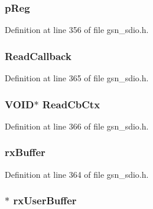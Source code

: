 \hypertarget{a00216_a733fb7afbc3bd37a546de0e37c12f150}{
\subsubsection[{pReg}]{ {\bf pReg}}}
\label{a00216_a733fb7afbc3bd37a546de0e37c12f150}


Definition at line 356 of file gsn\_\-sdio.h.

\hypertarget{a00216_a13c6299f64f8152d048be374004adc1d}{
\subsubsection[{ReadCallback}]{ {\bf ReadCallback}}}
\label{a00216_a13c6299f64f8152d048be374004adc1d}


Definition at line 365 of file gsn\_\-sdio.h.

\hypertarget{a00216_ab670c794162551aa7f8c6a4103007e7b}{
\subsubsection[{ReadCbCtx}]{\setlength{\rightskip}{0pt plus 5cm}VOID$\ast$ {\bf ReadCbCtx}}}
\label{a00216_ab670c794162551aa7f8c6a4103007e7b}


Definition at line 366 of file gsn\_\-sdio.h.

\hypertarget{a00216_ab33acc5a2a02cec5e984720d9be033c6}{
\subsubsection[{rxBuffer}]{ {\bf rxBuffer}}}
\label{a00216_ab33acc5a2a02cec5e984720d9be033c6}


Definition at line 364 of file gsn\_\-sdio.h.

\hypertarget{a00216_ab193a10d1ff3641a6f7675c7f15b1fd5}{
\subsubsection[{rxUserBuffer}]{$\ast$ {\bf rxUserBuffer}}}
\label{a00216_ab193a10d1ff3641a6f7675c7f15b1fd5}



